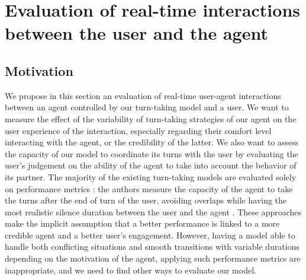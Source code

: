 \section{Evaluation of real-time interactions between the user and the agent}

\subsection{Motivation}

We propose in this section an evaluation of real-time user-agent interactions between an agent controlled by our turn-taking model and a user. We want to measure the effect of the variability of turn-taking strategies of our agent on the user experience of the interaction, especially regarding their comfort level interacting with the agent, or the credibility of the latter. We also want to assess the capacity of our model to coordinate its turns with the user by evaluating the user's judgement on the ability of the agent to take into account the behavior of its partner. The majority of the existing turn-taking models are evaluated solely on performance metrics : the authors measure the capacity of the agent to take the turns after the end of turn of the user, avoiding overlaps while having the most realistic silence duration between the user and the agent \cite{jonsdottir_distributed_2013}. These approaches make the implicit assumption that a better performance is linked to a more credible agent and a better user's engagement. However, having a model able to handle both conflicting situations and smooth transitions with variable durations depending on the motivation of the agent, applying such performance metrics are inappropriate, and we need to find other ways to evaluate our model. 

